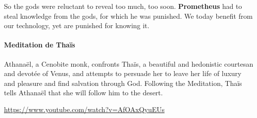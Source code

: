 So the gods were reluctant to reveal too much, too soon. \textbf{Prometheus} had to steal knowledge from the gods, for which he was punished. We today benefit from our technology, yet are punished for knowing it.

\paragraph{Meditation de Thaïs}


Athanaël, a Cenobite monk, confronts Thaïs, a beautiful and hedonistic courtesan and devotée of Venus, and attempts to persuade her to leave her life of luxury and pleasure and find salvation through God. Following the Meditation, Thaïs tells Athanaël that she will follow him to the desert.

\url{https://www.youtube.com/watch?v=AfOAxQyuEUs} 

